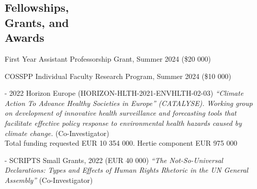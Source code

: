 \documentclass[margin,line,10.95pt]{res}
\begin{document}
\begin{resume}






\section{\sc Fellowships,   \\ Grants,  and  \\Awards}

First Year Assistant Professorship Grant, Summer 2024 (\$20 000)

\vspace*{-3.5mm}

COSSPP Individual Faculty Research Program, Summer 2024 (\$10 000)


- 2022 Horizon Europe (HORIZON-HLTH-2021-ENVHLTH-02-03) \textit{“Climate Action To Advance Healthy Societies in Europe” (CATALYSE). Working group on development of innovative health surveillance and forecasting tools that facilitate effective policy response to environmental health hazards caused by climate change.} (Co-Investigator)
\\
Total funding requested EUR 10 354 000. Hertie component EUR 975 000

\vspace*{-3.5mm}

- SCRIPTS Small Grants, 2022 (EUR 40 000) \textit{“The Not-So-Universal Declarations: Types and Effects of Human Rights Rhetoric in the UN General Assembly”} (Co-Investigator)


\end{resume}
\end{document}
